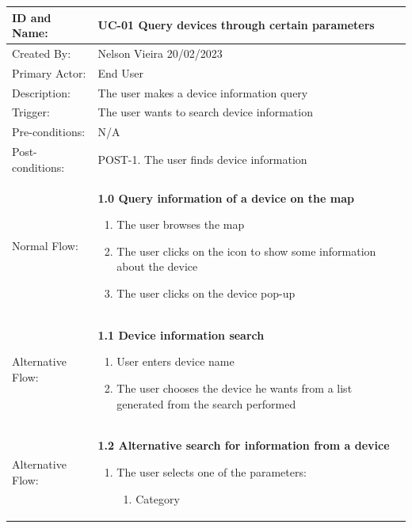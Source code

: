 \begin{table}[H]
    \centering
    \begin{adjustbox}{width=1.2\textwidth,center=\textwidth}
        \begin{tabular}{|m{4cm}|m{12cm}|}
            \hline
            ID and Name: & UC-01 Query devices through certain parameters \\
            \hline
            Created By: & Nelson Vieira 20/02/2023 \\
            \hline
            Primary Actor: & End User \\
            \hline
            Description: & The user makes a device information query \\
            \hline
            Trigger: & The user wants to search device information \\
            \hline
            Pre-conditions: & N/A \\
            \hline
            Post-conditions: & POST-1. The user finds device information \\
            \hline
            Normal Flow: & \textbf{1.0 Query information of a device on the map}
            \begin{enumerate}
                \item The user browses the map
                \item The user clicks on the icon to show some information about the device
                \item The user clicks on the device pop-up
            \end{enumerate} \\
            \hline
            Alternative Flow: & \textbf{1.1 Device information search}
            \begin{enumerate}
                \item User enters device name
                \item The user chooses the device he wants from a list generated from the search performed
            \end{enumerate} \\
            \hline
            Alternative Flow: & \textbf{1.2 Alternative search for information from a device}
            \begin{enumerate}
                \item The user selects one of the parameters:
                \begin{enumerate}
                    \item Category

\end{enumerate}
\end{enumerate}
\end{tabular}
\end{adjustbox}
\end{table}
